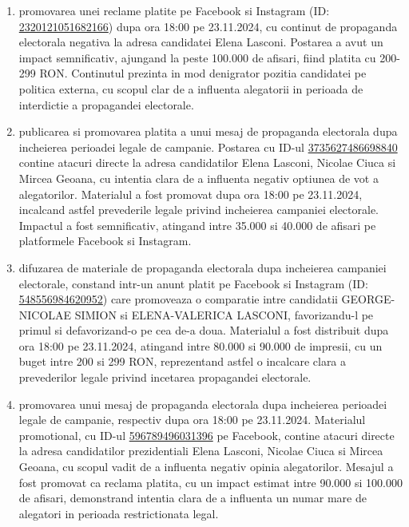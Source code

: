 \documentclass[a4paper,12pt]{article}
\begin{document}
\begin{enumerate}[leftmargin=*, label=\arabic*.)]
    \item promovarea unei reclame platite pe Facebook si Instagram (ID: \href{https://www.facebook.com/ads/library/?id=2320121051682166}{2320121051682166}) dupa ora 18:00 pe 23.11.2024, cu continut de propaganda electorala negativa la adresa candidatei Elena Lasconi. Postarea a avut un impact semnificativ, ajungand la peste 100.000 de afisari, fiind platita cu 200-299 RON. Continutul prezinta in mod denigrator pozitia candidatei pe politica externa, cu scopul clar de a influenta alegatorii in perioada de interdictie a propagandei electorale.
    \item publicarea si promovarea platita a unui mesaj de propaganda electorala dupa incheierea perioadei legale de campanie. Postarea cu ID-ul \href{https://www.facebook.com/ads/library/?id=3735627486698840}{3735627486698840} contine atacuri directe la adresa candidatilor Elena Lasconi, Nicolae Ciuca si Mircea Geoana, cu intentia clara de a influenta negativ optiunea de vot a alegatorilor. Materialul a fost promovat dupa ora 18:00 pe 23.11.2024, incalcand astfel prevederile legale privind incheierea campaniei electorale. Impactul a fost semnificativ, atingand intre 35.000 si 40.000 de afisari pe platformele Facebook si Instagram.
    \item difuzarea de materiale de propaganda electorala dupa incheierea campaniei electorale, constand intr-un anunt platit pe Facebook si Instagram (ID: \href{https://www.facebook.com/ads/library/?id=548556984620952}{548556984620952}) care promoveaza o comparatie intre candidatii GEORGE-NICOLAE SIMION si ELENA-VALERICA LASCONI, favorizandu-l pe primul si defavorizand-o pe cea de-a doua. Materialul a fost distribuit dupa ora 18:00 pe 23.11.2024, atingand intre 80.000 si 90.000 de impresii, cu un buget intre 200 si 299 RON, reprezentand astfel o incalcare clara a prevederilor legale privind incetarea propagandei electorale.
    \item promovarea unui mesaj de propaganda electorala dupa incheierea perioadei legale de campanie, respectiv dupa ora 18:00 pe 23.11.2024. Materialul promotional, cu ID-ul \href{https://www.facebook.com/ads/library/?id=596789496031396}{596789496031396} pe Facebook, contine atacuri directe la adresa candidatilor prezidentiali Elena Lasconi, Nicolae Ciuca si Mircea Geoana, cu scopul vadit de a influenta negativ opinia alegatorilor. Mesajul a fost promovat ca reclama platita, cu un impact estimat intre 90.000 si 100.000 de afisari, demonstrand intentia clara de a influenta un numar mare de alegatori in perioada restrictionata legal.

\end{enumerate}
\end{document}
